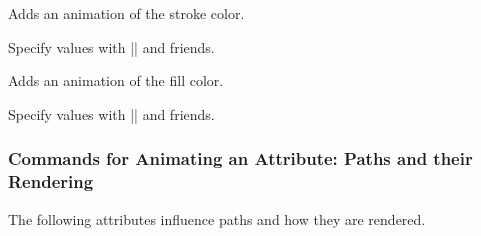 \begin{command}{\pgfsys@animatestrokecolor}
  Adds an animation of the stroke color.

  Specify values with |\pgfsys@animation@color@rgb| and friends.
\begin{codeexample}[width=2cm]
\end{codeexample}
\end{command}

\begin{command}{\pgfsys@animatefillcolor}
  Adds an animation of the fill color.
  
  Specify values with |\pgfsys@animation@color@rgb| and friends.
\begin{codeexample}[width=2cm]
\end{codeexample}
\end{command}


\subsubsection{Commands for Animating an Attribute: Paths and their Rendering}

The following attributes influence paths and how they are rendered.

